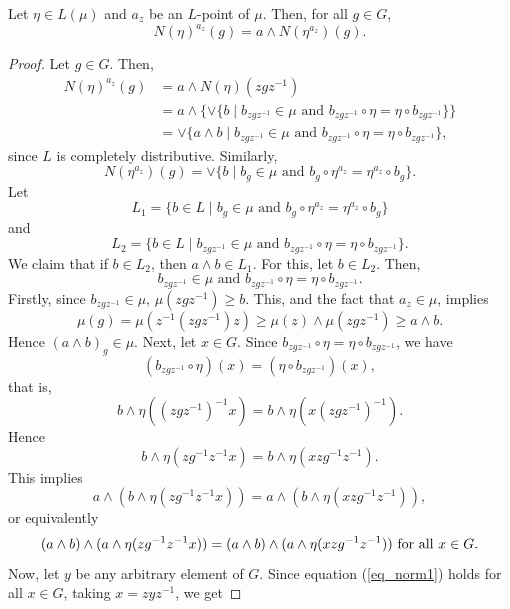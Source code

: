\documentclass[10pt,a4paper]{amsart}
\begin{document}
\begin{theorem}
	Let $\eta \in L(\mu)$ and $a_z$ be an $L$-point of $\mu$. Then, for all $g \in G$,
	\[ N(\eta)^{a_z}(g) = a \wedge N(\eta^{a_z})(g). \]
\end{theorem}

\begin{proof}
	Let $g \in G$. Then, 
	\begin{equation*}
	\begin{split} 
	N(\eta)^{a_z}(g) &= a \wedge N(\eta)(zgz^{-1}) \\
		&= a \wedge \{ \vee \{ b \mid b_{zgz^{-1}} \in \mu \text{ and } b_{zgz^{-1}} \circ \eta = \eta \circ b_{zgz^{-1}} \}\} \\
		&= \vee \{ a \wedge b \mid b_{zgz^{-1}} \in \mu \text{ and } b_{zgz^{-1}} \circ \eta = \eta \circ b_{zgz^{-1}} \},
	\end{split}
	\end{equation*}
	since $L$ is completely distributive. Similarly,
	\[ N(\eta^{a_z})(g) = \vee \{ b \mid b_g \in \mu \text{ and } b_g \circ \eta^{a_z} = \eta^{a_z} \circ b_g \}. \]
	Let 
	\[ L_1 = \{ b \in L \mid b_g \in \mu \text{ and } b_g \circ \eta^{a_z} = \eta^{a_z} \circ b_g \} \]
	and
	\[ L_2 = \{ b \in L \mid b_{zgz^{-1}} \in \mu \text{ and } b_{zgz^{-1}} \circ \eta = \eta \circ b_{zgz^{-1}} \}. \]
	We claim that if  $b \in L_2$, then $a \wedge b \in L_1$. For this, let $b \in L_2$. Then,
	\[ b_{zgz^{-1}} \in \mu \text{ and } b_{zgz^{-1}} \circ \eta = \eta \circ b_{zgz^{-1}}. \]
	Firstly, since $ b_{zgz^{-1}} \in \mu$,	$\mu(zgz^{-1}) \geq b$.	This, and the fact that $a_z \in \mu$, implies 
	\[ \mu(g) = \mu(z^{-1}(zgz^{-1})z) \geq \mu(z) \wedge \mu(zgz^{-1}) \geq a \wedge b. \]
	Hence $(a \wedge b)_g \in \mu$. Next, let $x \in G$. Since	$b_{zgz^{-1}} \circ \eta = \eta \circ b_{zgz^{-1}}$, we have
	\[ (b_{zgz^{-1}} \circ \eta)(x) = (\eta \circ b_{zgz^{-1}})(x), \]
	that is,
	\[ b \wedge \eta((zgz^{-1})^{-1}x) = b \wedge \eta(x(zgz^{-1})^{-1}). \]
	Hence
	\[  b \wedge \eta(zg^{-1}z^{-1}x) = b \wedge \eta(xzg^{-1}z^{-1}). \]
	This implies
	\[ a \wedge (b \wedge \eta(zg^{-1}z^{-1}x)) = a \wedge (b \wedge \eta(xzg^{-1}z^{-1})), \]
	or equivalently
	\begin{equation}{\label{eq_norm1}}
	 (a \wedge b) \wedge (a \wedge \eta(zg^{-1}z^{-1}x)) = (a \wedge b) \wedge (a \wedge \eta(xzg^{-1}z^{-1}))~\text{for all} ~x \in G.
	\end{equation}
	Now, let $y$ be any arbitrary element of $G$. Since equation (\ref{eq_norm1}) holds for all $x \in G$, taking $x = zyz^{-1}$, we get

\end{proof}
\end{document}
